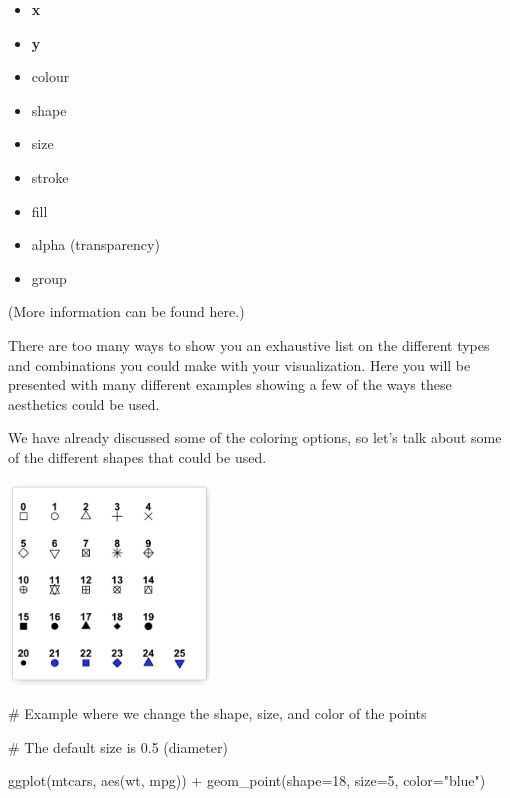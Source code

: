 \documentclass[
  letterpaper,
  DIV=11,
  numbers=noendperiod]{scrreprt}
\newenvironment{Shaded}{\begin{snugshade}}{\end{snugshade}}
\newcommand{\AttributeTok}[1]{\textcolor[rgb]{0.40,0.45,0.13}{#1}}
\newcommand{\CommentTok}[1]{\textcolor[rgb]{0.37,0.37,0.37}{#1}}
\newcommand{\DecValTok}[1]{\textcolor[rgb]{0.68,0.00,0.00}{#1}}
\newcommand{\FunctionTok}[1]{\textcolor[rgb]{0.28,0.35,0.67}{#1}}
\newcommand{\NormalTok}[1]{\textcolor[rgb]{0.00,0.23,0.31}{#1}}
\newcommand{\SpecialCharTok}[1]{\textcolor[rgb]{0.37,0.37,0.37}{#1}}
\newcommand{\StringTok}[1]{\textcolor[rgb]{0.13,0.47,0.30}{#1}}
\begin{document}
\begin{itemize}
\item
  \textbf{x}
\item
  \textbf{y}
\item
  colour
\item
  shape
\item
  size
\item
  stroke
\item
  fill
\item
  alpha (transparency)
\item
  group
\end{itemize}

(More information can be found here.)

There are too many ways to show you an exhaustive list on the different
types and combinations you could make with your visualization. Here you
will be presented with many different examples showing a few of the ways
these aesthetics could be used.

We have already discussed some of the coloring options, so let's talk
about some of the different shapes that could be used.

\includegraphics[width=0.4\textwidth,height=\textheight]{./images/AST_2.jpg}

\begin{Shaded}
\begin{Highlighting}[]
\CommentTok{\# Example where we change the shape, size, and color of the points}

\CommentTok{\# The default size is 0.5 (diameter)}

\FunctionTok{ggplot}\NormalTok{(mtcars, }\FunctionTok{aes}\NormalTok{(wt, mpg)) }\SpecialCharTok{+} 
  \FunctionTok{geom\_point}\NormalTok{(}\AttributeTok{shape=}\DecValTok{18}\NormalTok{, }\AttributeTok{size=}\DecValTok{5}\NormalTok{, }\AttributeTok{color=}\StringTok{"blue"}\NormalTok{)}
\end{Highlighting}
\end{Shaded}
\end{document}
